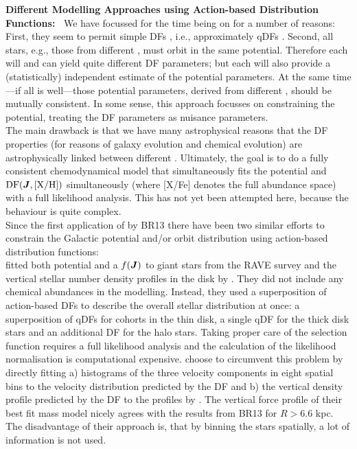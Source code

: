 {\bf Different Modelling Approaches using Action-based Distribution Functions:~} We have focussed for the time being on \MAPs{} for a number of reasons: First, they seem to permit simple DFs \citep{bov12b,bov12c,2012ApJ...753..148B}, i.e., approximately qDFs \citep{2013MNRAS.434..652T}. Second, all stars, e.g., those from different \MAPs{}, must orbit in the same potential. Therefore each \MAP{} will and can yield quite different DF parameters; but each \MAP{} will also provide a (statistically) independent estimate of the potential parameters. At the same time---if all is well---those potential parameters, derived from different \MAPs{}, should be mutually consistent. In some sense, this approach focusses on constraining the potential, treating the DF parameters as nuisance parameters.
\\The main drawback is that we have many astrophysical reasons that the DF properties (for reasons of galaxy evolution and chemical evolution) are astrophysically linked between different \MAPs{}. Ultimately, the goal is to do a fully consistent chemodynamical model that simultaneously fits the potential and $\text{DF}(\boldsymbol{J},\text{[X/H]})$ simultaneously (where [X/Fe] denotes the full abundance space) with a full likelihood analysis. This has not yet been attempted here, because the behaviour is quite complex. 
\\Since the first application of \RM{} by BR13 there have been two similar efforts to constrain the Galactic potential and/or orbit distribution using action-based distribution functions:
\\\citet{2014MNRAS.445.3133P} fitted both potential and a $f(\boldsymbol{J})$ to giant stars from the RAVE survey \citep{2006AJ....132.1645S} and the vertical stellar number density profiles in the disk by \citet{2008ApJ...673..864J}. They did not include any chemical abundances in the modelling. Instead, they used a superposition of action-based DFs to describe the overall stellar distribution at once: a superposition of qDFs for cohorts in the thin disk, a single qDF \Wilma{[TO DO: CHECK]} for the thick disk stars and an additional DF for the halo stars. Taking proper care of the selection function requires a full likelihood analysis and the calculation of the likelihood normalisation is computational expensive. \citet{2014MNRAS.445.3133P} choose to circumvent this problem by directly fitting a) histograms of the three velocity components in eight spatial bins to the velocity distribution predicted by the DF and b) the vertical density profile predicted by the DF to the profiles by \citet{2008ApJ...673..864J}. The vertical force profile of their best fit mass model nicely agrees with the results from BR13 for $R>6.6$ kpc. The disadvantage of their approach is, that by binning the stars spatially, a lot of information is not used.
